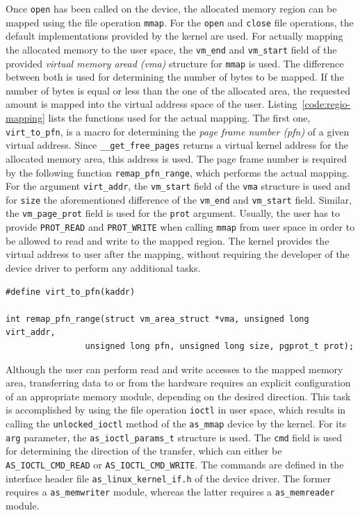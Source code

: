 Once \texttt{open} has been called on the device, the allocated memory region can be mapped using the file operation \texttt{mmap}.
For the \texttt{open} and \texttt{close} file operations, the default implementations provided by the kernel are used.
For actually mapping the allocated memory to the user space, the \texttt{vm\_end} and \texttt{vm\_start} field of the provided \textit{virtual memory aread (vma)} structure for \texttt{mmap} is used.
The difference between both is used for determining the number of bytes to be mapped.
If the number of bytes is equal or less than the one of the allocated area, the requested amount is mapped into the virtual address space of the user.
Listing~\ref{code:regio-mapping} lists the functions used for the actual mapping.
The first one, \texttt{virt\_to\_pfn}, is a macro for determining the \textit{page frame number (pfn)} of a given virtual address.
Since \texttt{\_\_get\_free\_pages} returns a virtual kernel address for the allocated memory area, this address is used.
The page frame number is required by the following function \texttt{remap\_pfn\_range}, which performs the actual mapping.
For the argument \texttt{virt\_addr}, the \texttt{vm\_start} field of the \texttt{vma} structure is used and for \texttt{size} the aforementioned difference of the \texttt{vm\_end} and \texttt{vm\_start} field.
Similar, the \texttt{vm\_page\_prot} field is used for the \texttt{prot} argument.
Usually, the user has to provide \texttt{PROT\_READ} and \texttt{PROT\_WRITE} when calling \texttt{mmap} from user space in order to be allowed to read and write to the mapped region.
The kernel provides the virtual address to user after the mapping, without requiring the developer of the device driver to perform any additional tasks.

\begin{lstlisting}[style=CStyle, label=code:regio-mapping, caption=Functions for allowing to access physical addresses]
#define virt_to_pfn(kaddr)

int remap_pfn_range(struct vm_area_struct *vma, unsigned long virt_addr,
				unsigned long pfn, unsigned long size, pgprot_t prot);

\end{lstlisting}

Although the user can perform read and write accesses to the mapped memory area, transferring data to or from the hardware requires an explicit configuration of an appropriate memory module, depending on the desired direction.
This task is accomplished by using the file operation \texttt{ioctl} in user space, which results in calling the \texttt{unlocked\_ioctl} method of the \texttt{as\_mmap} device by the kernel.
For its \texttt{arg} parameter, the \texttt{as\_ioctl\_params\_t} structure is used.
The \texttt{cmd} field is used for determining the direction of the transfer, which can either be \texttt{AS\_IOCTL\_CMD\_READ} or \texttt{AS\_IOCTL\_CMD\_WRITE}.
The commands are defined in the interface header file \texttt{as\_linux\_kernel\_if.h} of the device driver.
The former requires a \texttt{as\_memwriter} module, whereas the latter requires a \texttt{as\_memreader} module.


